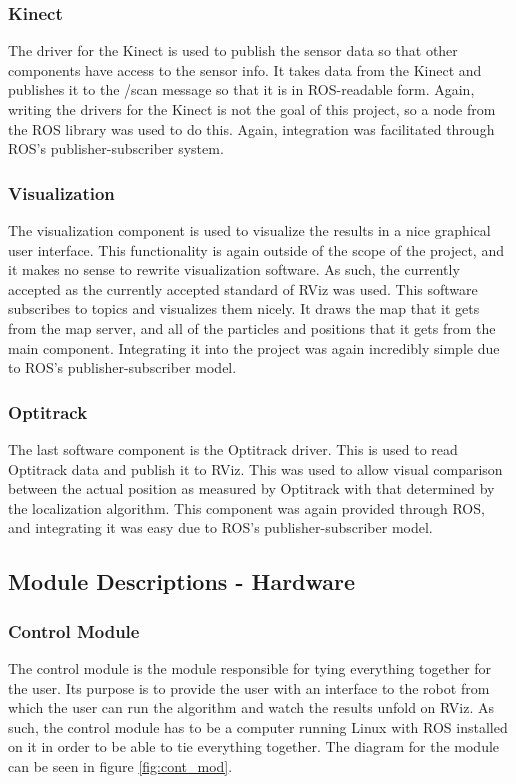 \documentclass{article}
\newcommand\tab[1][0.5cm]{\hspace*{#1}}
\newcounter{subsubsubsection}[subsubsection]
\begin{document}
\subsubsection{Kinect}
\tab The driver for the Kinect is used to publish the sensor data so that other components have access to the sensor info. It takes data from the Kinect and publishes it to the /scan message so that it is in ROS-readable form. Again, writing the drivers for the Kinect is not the goal of this project, so a node from the ROS library was used to do this. Again, integration was facilitated through ROS’s publisher-subscriber system.

\subsubsection{Visualization}
\tab The visualization component is used to visualize the results in a nice graphical user interface. This functionality is again outside of the scope of the project, and it makes no sense to rewrite visualization software. As such, the currently accepted as the currently accepted standard of RViz was used. This software subscribes to topics and visualizes them nicely. It draws the map that it gets from the map server, and all of the particles and positions that it gets from the main component. Integrating it into the project was again incredibly simple due to ROS’s publisher-subscriber model.

\subsubsection{Optitrack}
\tab The last software component is the Optitrack driver. This is used to read Optitrack data and publish it to RViz. This was used to allow visual comparison between the actual position as measured by Optitrack with that determined by the localization algorithm. This component was again provided through ROS, and integrating it was easy due to ROS’s publisher-subscriber model.

\subsection{Module Descriptions - Hardware}
\subsubsection{Control Module}
\tab The control module is the module responsible for tying everything together for the user. Its purpose is to provide the user with an interface to the robot from which the user can run the algorithm and watch the results unfold on RViz. As such, the control module has to be a computer running Linux with ROS installed on it in order to be able to tie everything together. The diagram for the module can be seen in figure \ref{fig:cont_mod}.\\
\end{document}
